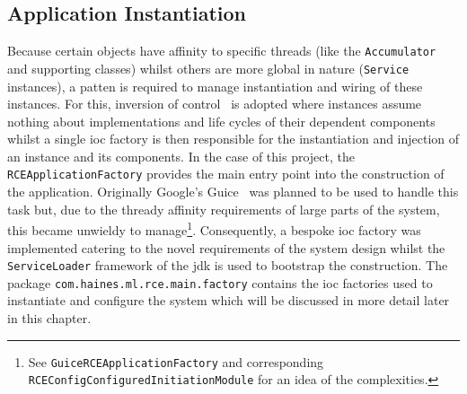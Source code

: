 \documentclass[a4paper,11pt]{scrreprt}
\begin{document}
\subsection{Application Instantiation}
Because certain objects have affinity to specific threads (like the \verb|Accumulator| and supporting classes) whilst others are more global in nature (\verb|Service| instances), a patten is required to manage instantiation and wiring of these instances. For this, inversion of control~\cite{ioc} is adopted where instances assume nothing about implementations and life cycles of their dependent components whilst a single \acrshort{ioc} factory is then responsible for the instantiation and injection of an instance and its components. In the case of this project, the \verb|RCEApplicationFactory| provides the main entry point into the construction of the application. Originally Google's Guice~\cite{guice} was planned to be used to handle this task but, due to the thready affinity requirements of large parts of the system, this became unwieldy to manage\footnote{See \verb|GuiceRCEApplicationFactory| and corresponding \verb|RCEConfigConfiguredInitiationModule| for an idea of the complexities.}. Consequently, a bespoke \acrshort{ioc} factory was implemented catering to the novel requirements of the system design whilst the \verb|ServiceLoader| framework of the \acrshort{jdk} is used to bootstrap the construction. The package \verb|com.haines.ml.rce.main.factory| contains the \acrshort{ioc} factories used to instantiate and configure the system which will be discussed in more detail later in this chapter.
\end{document}
